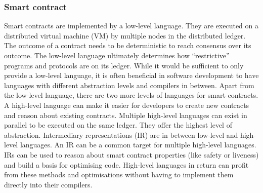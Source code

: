 \subsubsection{Smart contract}
Smart contracts are implemented by a low-level language.
They are executed on a distributed virtual machine (VM) by multiple nodes in the distributed ledger.
The outcome of a contract needs to be deterministic to reach consensus over its outcome.
The low-level language ultimately determines how ``restrictive'' programs and protocols are on its ledger.
While it would be sufficient to only provide a low-level language, it is often beneficial in software development to have languages with different abstraction levels and compilers in between.
Apart from the low-level language, there are two more levels of languages for smart contracts.
A high-level language can make it easier for developers to create new contracts and reason about existing contracts.
Multiple high-level languages can exist in parallel to be executed on the same ledger. 
They offer the highest level of abstraction.
Intermediary representations (IR) are in between low-level and high-level languages. 
An IR can be a common target for multiple high-level languages.
IRs can be used to reason about smart contract properties (like safety or liveness) and build a basis for optimising code. 
High-level languages in return can profit from these methods and optimisations without having to implement them directly into their compilers.




